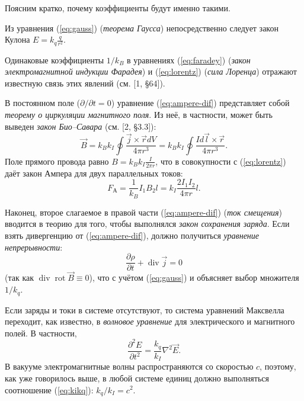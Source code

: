 Поясним кратко, почему коэффициенты будут именно такими.

Из уравнения (\ref{eq:gauss}) (\emph{теорема Гаусса}) непосредственно
следует закон Кулона $E=k_{q}\frac{q}{r^{2}}$.

Одинаковые коэффициенты $1/k_{B}$ в уравнениях (\ref{eq:faradey})
(\emph{закон электромагнитной индукции Фарадея}) и (\ref{eq:lorentz})
(\emph{сила Лоренца}) отражают известную связь этих явлений
(см. [1, \S64]).

В постоянном поле ($\partial/\partial t=0$) уравнение (\ref{eq:ampere-dif})
представляет собой \emph{теорему о циркуляции магнитного поля}. Из
неё, в частности, может быть выведен \emph{закон Био--Савара}
 (см. [2, \S3.3]):
\[
\vec{B}=k_{B}k_{I}\oint\frac{\vec{j}\times\vec{r}dV}{4\pi r^{3}}=k_{B}k_{I}\oint\frac{Id\vec{l}\times\vec{r}}{4\pi r^{3}}.
\]
Поле прямого провода равно $B=k_{B}k_{I}\frac{I}{2\pi r}$, что в
совокупности с (\ref{eq:lorentz}) даёт закон Ампера для двух параллельных
токов:
\[
F_{\text{А}}=\frac{1}{k_{B}}I_{1}B_{2}l=k_{I}\frac{2I_{1}I_{2}}{4\pi r}l.
\]

Наконец, второе слагаемое в правой части (\ref{eq:ampere-dif}) (\emph{ток
смещения}) вводится в теорию для того, чтобы выполнялся
\emph{закон сохранения заряда}. Если взять дивергенцию от (\ref{eq:ampere-dif}),
должно получиться \emph{уравнение непрерывности}:
\[
\frac{\partial\rho}{\partial t}+\mathop{\mathrm{div}}\vec{j}=0
\]
(так как $\mathop{\mathrm{div}}\mathop{\mathrm{rot}}\vec{B}\equiv 0$),
что с учётом (\ref{eq:gauss}) и объясняет выбор множителя~$1/k_{q}$.

Если заряды и токи в системе отсутствуют, то система уравнений Максвелла
переходит, как известно, в \emph{волновое уравнение} для электрического
и магнитного полей. В частности,
\[
\frac{\partial^{2}E}{\partial t^{2}}=\frac{k_{q}}{k_{I}}\nabla^{2}\vec{E}.
\]
В вакууме электромагнитные волны распространяются со скоростью $c$,
поэтому, как уже говорилось выше, в любой системе единиц должно выполняться
соотношение (\ref{eq:kikq}): $k_{q}/k_{I}=c^{2}$.

